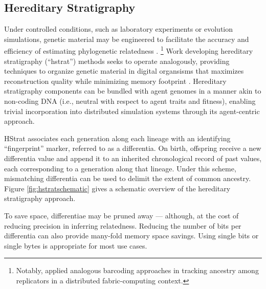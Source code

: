 \subsection{Hereditary Stratigraphy} \label{sec:introduction:hstrat}



Under controlled conditions, such as laboratory experiments or evolution simulations, genetic material may be engineered to facilitate the accuracy and efficiency of estimating phylogenetic relatedness \citep{li2024reconstructing}.
\footnote{Notably, \citet{ackley2023robust} applied analogous barcoding approaches in tracking ancestry among replicators in a distributed fabric-computing context.}
Work developing hereditary stratigraphy (``hstrat'') methods seeks to operate analogously, providing techniques to organize genetic material in digital organsisms that maximizes reconstruction quality while minimizing memory footprint \citep{moreno2022hereditary}.
Hereditary stratigraphy components can be bundled with agent genomes in a manner akin to non-coding DNA (i.e., neutral with respect to agent traits and fitness), enabling trivial incorporation into distributed simulation systems through its agent-centric approach.

HStrat associates each generation along each lineage with an identifying ``fingerprint'' marker, referred to as a differentia.
On birth, offspring receive a new differentia value and append it to an inherited chronological record of past values, each corresponding to a generation along that lineage.
Under this scheme, mismatching differentia can be used to delimit the extent of common ancestry.
Figure \ref{fig:hstratschematic} gives a schematic overview of the hereditary stratigraphy approach.

To save space, differentiae may be pruned away --- although, at the cost of reducing precision in inferring relatedness.
Reducing the number of bits per differentia can also provide many-fold memory space savings.
Using single bits or single bytes is appropriate for most use cases.

